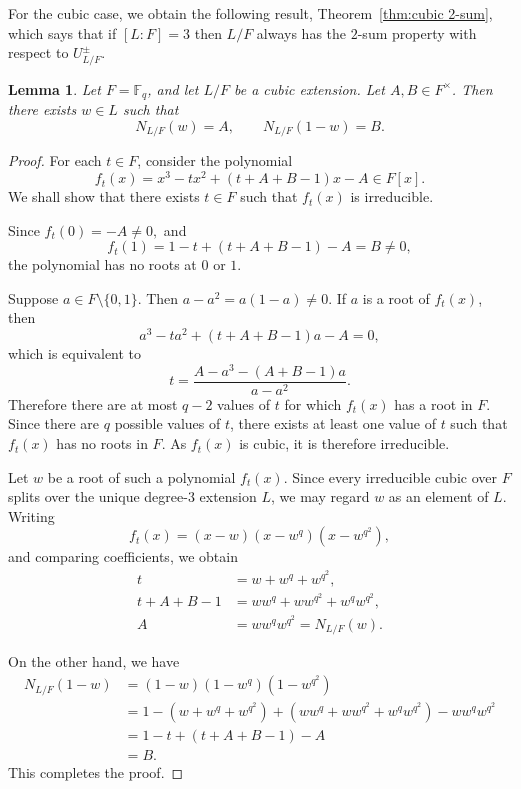 \documentclass[11pt, a4paper]{amsart}
\newtheorem{lem}[thm]{Lemma}
\theoremstyle{definition}
\numberwithin{equation}{section}
\begin{document}
For the cubic case, we obtain the following result, Theorem~\ref{thm:cubic 2-sum}, which says that if $[L:F]=3$ then $L/F$ always has the $2$-sum property  with respect to $U_{L/F}^{\pm}$. 

\begin{lem}
Let $F=\mathbb{F}_q$, and let $L/F$ be a cubic extension.
Let $A,B\in F^\times$. Then there exists $w\in L$ such that
\[ N_{L/F}(w)=A,\qquad N_{L/F}(1-w)=B.
\]
\end{lem}

\begin{proof}
For each $t\in F$, consider the polynomial
\[
f_t(x) =
x^3-tx^2+(t+A+B-1)x-A \in F[x].
\]
We shall show that there exists $t\in F$ such that $f_t(x)$ is irreducible.

Since \( f_t(0)=-A\neq0,\) and 
\[ f_t(1) = 1-t+(t+A+B-1)-A = B\neq0, \]
the polynomial has no roots at $0$ or $1$.

Suppose $a\in F\setminus\{0,1\}$. Then \( a-a^2=a(1-a)\neq0.\)
If $a$ is a root of $f_t(x)$, then
\[ a^3-ta^2+(t+A+B-1)a-A=0,\]
which is equivalent to
\[ t = \frac{A-a^3-(A+B-1)a}{a-a^2}. \]
Therefore there are at most $q-2$ values of $t$ for which $f_t(x)$ has a root in $F$.
Since there are $q$ possible values of $t$, there exists at least one value of $t$ such that $f_t(x)$ has no roots in $F$.
As $f_t(x)$ is cubic, it is therefore irreducible.

Let $w$ be a root of such a polynomial $f_t(x)$. 
Since every irreducible cubic over $F$ splits over the unique degree-$3$ extension $L$, we may regard $w$ as an element of $L$.
Writing
\[ f_t(x) =  (x-w)(x-w^q)(x-w^{q^2}), \]
and comparing coefficients, we obtain
\[
\begin{aligned}
t &=w+w^q+w^{q^2},\\
t+A+B-1 &=ww^q+ww^{q^2}+w^qw^{q^2},\\
A&=ww^qw^{q^2} = N_{L/F}(w).
\end{aligned}
\]

On the other hand, we have
\begin{align*}
N_{L/F}(1-w) &= (1-w)(1-w^q)(1-w^{q^2}) \\
&= 1-(w+w^q+w^{q^2}) +(ww^q+ww^{q^2}+w^qw^{q^2}) -ww^qw^{q^2} \\
&= 1-t+(t+A+B-1)-A \\
&= B.
\end{align*}
This completes the proof.
\end{proof}
\end{document}
